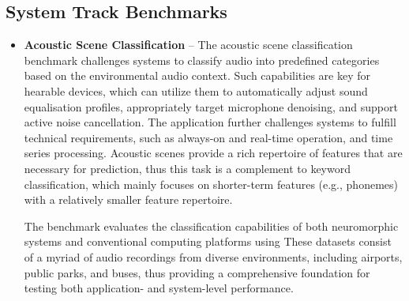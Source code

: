     \subsection*{System Track Benchmarks}
    \begin{itemize}
        \item \textbf{Acoustic Scene Classification} -- The acoustic scene classification benchmark challenges systems to classify audio into predefined categories based on the environmental audio context. 
        Such capabilities are key for hearable devices, which can utilize them to automatically adjust sound equalisation profiles, appropriately target microphone denoising, and support active noise cancellation.
        The application further challenges systems to fulfill technical requirements, such as always-on and real-time operation, and time series processing.
        Acoustic scenes provide a rich repertoire of features that are necessary for prediction, thus this task is a complement to keyword classification, which mainly focuses on shorter-term features (e.g., phonemes) with a relatively smaller feature repertoire.

        
        The benchmark evaluates the classification capabilities of both neuromorphic systems and conventional computing platforms using  
        These datasets consist of a myriad of audio recordings from diverse environments, including airports, public parks, and buses, thus providing a comprehensive foundation for testing both application- and system-level performance. 


\end{itemize}
